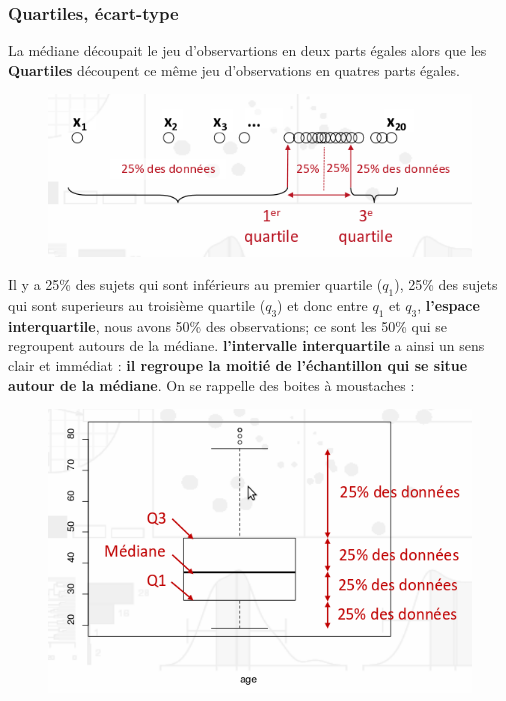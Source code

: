 \subsubsection{Quartiles, écart-type}
La médiane découpait le jeu d'observartions en deux parts égales alors que les \textbf{Quartiles} découpent ce même jeu d'observations en quatres parts égales.
\begin{figure}[H]\begin{center}\includegraphics[scale=0.5]{ilu/g6.png}\end{center}\end{figure}
Il y a 25\% des sujets qui sont inférieurs au premier quartile ($q_{1}$),  25\% des sujets qui sont superieurs au troisième quartile ($q_{3}$) et donc entre $q_{1}$ et $q_{3}$, \textbf{l'espace interquartile}, nous avons 50\% des observations; ce sont les 50\% qui se regroupent autours de la médiane. \textbf{l'intervalle interquartile} a ainsi un sens clair et immédiat : \textbf{il regroupe la moitié de l'échantillon qui se situe autour de la médiane}. On se rappelle des boites à moustaches : 
\begin{figure}[H]\begin{center}\includegraphics[scale=0.5]{ilu/g7.png}\end{center}\end{figure}
